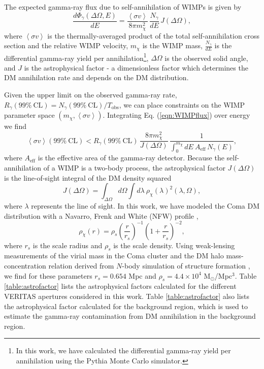 \documentclass[12pt,manuscript]{aastex}
\newcommand{\expval}[1]{\left\langle #1 \right\rangle}
\begin{document}
The expected gamma-ray flux due to self-annihilation of WIMPs is given by
\begin{equation}
\frac{d\Phi_{\gamma}(\Delta\Omega,E)}{dE}=
\frac{\expval{\sigma v}}{8\pi m_{\chi}^{2}}\,\frac{N_{\gamma}}{dE}\, J(\Delta\Omega),
\label{eqn:WIMPflux}
\end{equation}
where $\expval{\sigma v}$ is the thermally-averaged product of the total self-annihilation cross
section and the relative WIMP velocity, $m_{\chi}$ is the WIMP mass, $\frac{N_{\gamma}}{dE}$ is the
differential gamma-ray yield per annihilation\footnote{In this work, we have calculated the
differential gamma-ray yield per annihilation using the Pythia Monte Carlo simulator.},
$\Delta\Omega$ is the observed solid angle, and $J$ is the astrophysical factor - a dimensionless
factor which determines the DM annihilation rate and depends on the DM distribution.

Given the upper limit on the observed gamma-ray rate,
$R_{\gamma}(99\%\ \mathrm{CL}) = N_{\gamma}(99\%\ \mathrm{CL}) / T_{\mathrm{obs}}$, we can place
constraints on the WIMP parameter space $(m_{\chi}, \expval{\sigma v})$. Integrating Eq.
(\ref{eqn:WIMPflux}) over energy we find
\begin{equation}
\expval{\sigma v}(99\%\ \mathrm{CL}) <
R_{\gamma}(99\%\ \mathrm{CL})\, \frac{8\pi m_{\chi}^{2}}{J(\Delta\Omega)}\,
\frac{1}{\int^{m_{\chi}}_{0} dE\ A_{\mathrm{eff}}\,N_\gamma (E)},
\end{equation}
where $A_{\mathrm{eff}}$ is the effective area of the gamma-ray detector.
Because the self-annihilation of a WIMP is a two-body process, the astrophysical factor
$J(\Delta\Omega)$ is the line-of-sight integral of the DM density squared
\begin{equation}
J(\Delta\Omega)=\int_{\Delta\Omega}d\Omega\int d\lambda\ \rho_{\chi}(\lambda)^{2}(\lambda,\Omega),
\end{equation}
where $\lambda$ represents the line of sight. In this work, we have modeled the Coma DM
distribution with a Navarro, Frenk and White (NFW) profile \citet{article:NavarroFrenkWhite:1997},
\begin{equation}
\rho_{\chi}(r)=\rho_{s}\left(\frac{r}{r_{s}}\right)^{-1}\left(1+\frac{r}{r_{s}}\right)^{-2},
\end{equation}
where $r_{s}$ is the scale radius and $\rho_{s}$ is the scale density. Using weak-lensing
measurements of the virial mass in the Coma cluster \citep{article:Gavazzi_etal:2009} and the DM
halo mass-concentration relation derived from $N$-body simulation of structure formation 
\citep{article:Bullock_etal:2001}, we find for these parameters $r_{s}=0.654$ Mpc and
$\rho_{s}=4.4\times 10^{4}$ M$_{\odot}$/Mpc$^{3}$. Table \ref{table:astrofactor} lists the
astrophysical factors calculated for the different VERITAS apertures considered in this work.
Table \ref{table:astrofactor} also lists the astrophysical factor calculated for the background
region, which is used to estimate the gamma-ray contamination from DM annihilation in the
background region.
\end{document}

